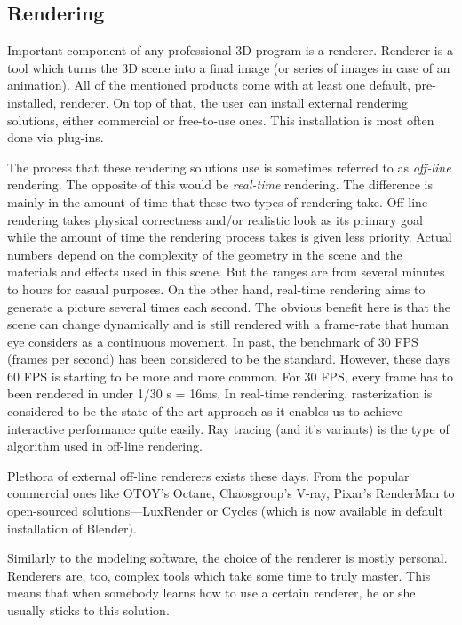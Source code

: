 \documentclass[
  digital, %
  table,   %
  nolof,     %
  nolot,     %
  oneside,
]{fithesis3}
\begin{document}
\subsection{Rendering}
Important component of any professional 3D program is a renderer. Renderer is a tool which turns the 3D scene into a final image (or series of images in case of an animation). All of the mentioned products come with at least one default, pre-installed, renderer. On top of that, the user can install external rendering solutions, either commercial or free-to-use ones. This installation is most often done via plug-ins.

The process that these rendering solutions use is sometimes referred to as \textit{off-line} rendering. The opposite of this would be \textit{real-time} rendering. The difference is mainly in the amount of time that these two types of rendering take. Off-line rendering takes physical correctness and/or realistic look as its primary goal while the amount of  time the rendering process takes is given less priority. Actual numbers depend on the complexity of the geometry in the scene and the materials and effects used in this scene. But the ranges are from several minutes to hours for casual purposes. On the other hand, real-time rendering aims to generate a picture several times each second. The obvious benefit here is that the scene can change dynamically and is still rendered with a frame-rate that human eye considers as a continuous movement. In past, the benchmark of 30 FPS (frames per second) has been considered to be the standard. However, these days 60 FPS is starting to be more and more common. For 30 FPS, every frame has to been rendered in under 1/30 s = 16ms. In real-time rendering, rasterization\cite{rasterization-paper} is considered to be the state-of-the-art approach as it enables us to achieve interactive performance quite easily. Ray tracing (and it's variants) is the type of algorithm used in off-line rendering\cite{pbr-book}.

Plethora of external off-line renderers exists these days. From the popular commercial ones like OTOY's Octane, Chaosgroup's V-ray, Pixar's RenderMan to open-sourced solutions—LuxRender or Cycles (which is now available in default installation of Blender).

Similarly to the modeling software, the choice of the renderer is mostly personal. Renderers are, too, complex tools  which take some time to truly master. This means that when somebody learns how to use a certain renderer, he or she usually sticks to this solution.
\end{document}
